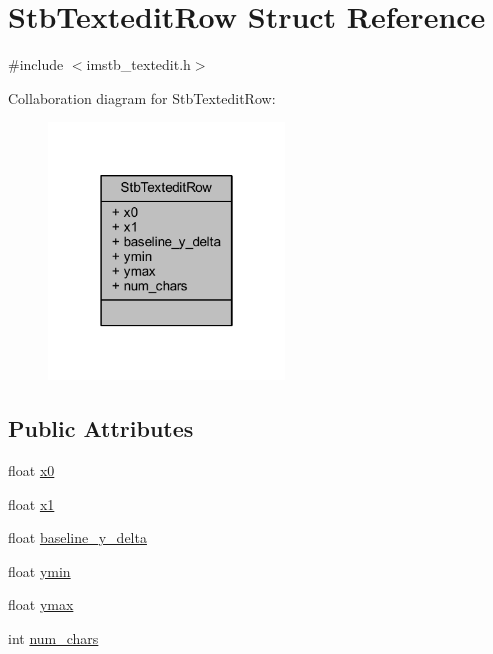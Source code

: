 \hypertarget{struct_stb_textedit_row}{}\section{Stb\+Textedit\+Row Struct Reference}
\label{struct_stb_textedit_row}


{\ttfamily \#include $<$imstb\+\_\+textedit.\+h$>$}



Collaboration diagram for Stb\+Textedit\+Row\+:
\nopagebreak
\begin{figure}[H]
\begin{center}
\leavevmode
\includegraphics[width=178pt]{struct_stb_textedit_row__coll__graph}
\end{center}
\end{figure}
\subsection*{Public Attributes}
\begin{DoxyCompactItemize}
\item 
float \mbox{\hyperlink{struct_stb_textedit_row_af30b3e1d61d1acea26d3e0ebec2cb81d}{x0}}
\item 
float \mbox{\hyperlink{struct_stb_textedit_row_a3a3e1a506030c871a1b3d09bf26e341f}{x1}}
\item 
float \mbox{\hyperlink{struct_stb_textedit_row_ad2d72b74b1a61e331949c7f7ec311880}{baseline\+\_\+y\+\_\+delta}}
\item 
float \mbox{\hyperlink{struct_stb_textedit_row_a707d331bd9dc99d64c81f71106b75eed}{ymin}}
\item 
float \mbox{\hyperlink{struct_stb_textedit_row_aab290e15f6a3b4a96ab2c2472cc8a7a5}{ymax}}
\item 
int \mbox{\hyperlink{struct_stb_textedit_row_a1a19bebadb3f82b4f86ea29698d77084}{num\+\_\+chars}}
\end{DoxyCompactItemize}


